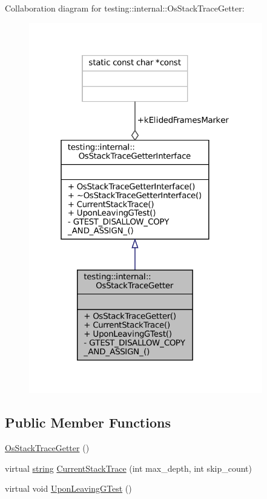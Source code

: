 Collaboration diagram for testing\+:\+:internal\+:\+:Os\+Stack\+Trace\+Getter\+:
\nopagebreak
\begin{figure}[H]
\begin{center}
\leavevmode
\includegraphics[width=289pt]{classtesting_1_1internal_1_1OsStackTraceGetter__coll__graph}
\end{center}
\end{figure}
\subsection*{Public Member Functions}
\begin{DoxyCompactItemize}
\item 
\hyperlink{classtesting_1_1internal_1_1OsStackTraceGetter_aa40b3120c0ae4ec640de8b577ab7da17}{Os\+Stack\+Trace\+Getter} ()
\item 
virtual \hyperlink{namespacetesting_1_1internal_a8e8ff5b11e64078831112677156cb111}{string} \hyperlink{classtesting_1_1internal_1_1OsStackTraceGetter_ad85d7766a222befa3e7f3c6932046ac2}{Current\+Stack\+Trace} (int max\+\_\+depth, int skip\+\_\+count)
\item 
virtual void \hyperlink{classtesting_1_1internal_1_1OsStackTraceGetter_a8ae0237629b6b5672b4b5ef8e292205c}{Upon\+Leaving\+G\+Test} ()
\end{DoxyCompactItemize}
